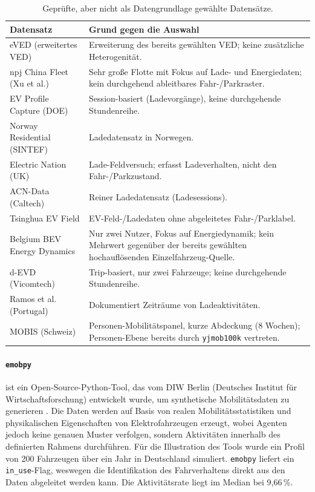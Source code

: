 \begin{table}[H]
  \centering
  \small
  \caption{Geprüfte, aber nicht als Datengrundlage gewählte Datensätze.}
  \label{tab:verworfene_daten}
  \begin{tabularx}{\textwidth}{@{}l X@{}}
    \toprule
    \textbf{Datensatz} & \textbf{Grund gegen die Auswahl} \\
    \midrule
    eVED (erweitertes VED)        & Erweiterung des bereits gewählten VED; keine zusätzliche Heterogenität. \\
    \addlinespace
    npj China Fleet (Xu et al.)   & Sehr große Flotte mit Fokus auf Lade- und Energiedaten; kein durchgehend ableitbares Fahr-/Parkraster. \\
    \addlinespace
    EV Profile Capture (DOE)      & Session-basiert (Ladevorgänge), keine durchgehende Stundenreihe. \\
    \addlinespace
    Norway Residential (SINTEF)   & Ladedatensatz in Norwegen. \\
    \addlinespace
    Electric Nation (UK)          & Lade-Feldversuch; erfasst Ladeverhalten, nicht den Fahr-/Parkzustand. \\
    \addlinespace
    ACN-Data (Caltech)            & Reiner Ladedatensatz (Ladesessions). \\
    \addlinespace
    Tsinghua EV Field             & EV-Feld-/Ladedaten ohne abgeleitetes Fahr-/Parklabel. \\
    \addlinespace
    Belgium BEV Energy Dynamics   & Nur zwei Nutzer, Fokus auf Energiedynamik; kein Mehrwert gegenüber der bereits gewählten hochauflösenden Einzelfahrzeug-Quelle. \\
    \addlinespace
    d-EVD (Vicomtech)             & Trip-basiert, nur zwei Fahrzeuge; keine durchgehende Stundenreihe. \\
    \addlinespace
    Ramos et al. (Portugal)       & Dokumentiert Zeiträume von Ladeaktivitäten. \\
    \addlinespace
    MOBIS (Schweiz)               & Personen-Mobilitätspanel, kurze Abdeckung (8 Wochen); Personen-Ebene bereits durch \texttt{yjmob100k} vertreten. \\
    \bottomrule
  \end{tabularx}
\end{table}


\paragraph{\texttt{emobpy}} ist ein Open-Source-Python-Tool, das vom DIW Berlin (Deutsches Institut für Wirtschaftsforschung) entwickelt wurde, um synthetische Mobilitätsdaten zu generieren \parencite{emobpy_nature}. Die Daten werden auf Basis von realen Mobilitätsstatistiken und physikalischen Eigenschaften von Elektrofahrzeugen erzeugt, wobei Agenten jedoch keine genauen Muster verfolgen, sondern Aktivitäten innerhalb des definierten Rahmens durchführen. Für die Illustration des Tools wurde ein Profil von 200 Fahrzeugen über ein Jahr in Deutschland simuliert. \texttt{emobpy} liefert ein \texttt{in\_use}-Flag, weswegen die Identifikation des Fahrverhaltens direkt aus den Daten abgeleitet werden kann. Die Aktivitätsrate liegt im Median bei 9,66\,\%.

